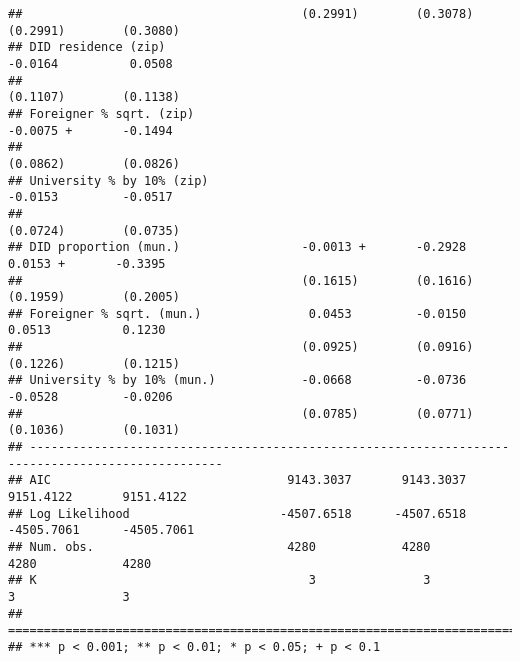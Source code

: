 \documentclass[
]{article}
\begin{document}
\begin{verbatim}
##                                       (0.2991)        (0.3078)        (0.2991)        (0.3080)   
## DID residence (zip)                                                   -0.0164          0.0508    
##                                                                       (0.1107)        (0.1138)   
## Foreigner % sqrt. (zip)                                               -0.0075 +       -0.1494    
##                                                                       (0.0862)        (0.0826)   
## University % by 10% (zip)                                             -0.0153         -0.0517    
##                                                                       (0.0724)        (0.0735)   
## DID proportion (mun.)                 -0.0013 +       -0.2928          0.0153 +       -0.3395    
##                                       (0.1615)        (0.1616)        (0.1959)        (0.2005)   
## Foreigner % sqrt. (mun.)               0.0453         -0.0150          0.0513          0.1230    
##                                       (0.0925)        (0.0916)        (0.1226)        (0.1215)   
## University % by 10% (mun.)            -0.0668         -0.0736         -0.0528         -0.0206    
##                                       (0.0785)        (0.0771)        (0.1036)        (0.1031)   
## -------------------------------------------------------------------------------------------------
## AIC                                 9143.3037       9143.3037       9151.4122       9151.4122    
## Log Likelihood                     -4507.6518      -4507.6518      -4505.7061      -4505.7061    
## Num. obs.                           4280            4280            4280            4280         
## K                                      3               3               3               3         
## =================================================================================================
## *** p < 0.001; ** p < 0.01; * p < 0.05; + p < 0.1
\end{verbatim}
\end{document}

